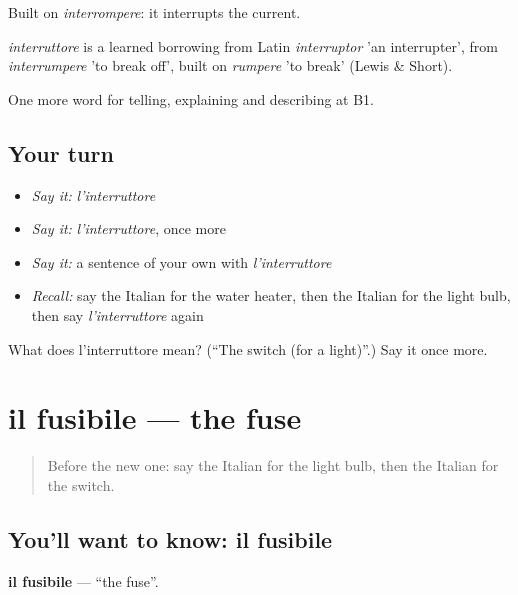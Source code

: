 Built on \emph{interrompere}: it interrupts the current.

\begin{cousinweb}
\emph{interruttore} is a learned borrowing from Latin \emph{interruptor} 'an interrupter', from \emph{interrumpere} 'to break off', built on \emph{rumpere} 'to break' (Lewis \& Short).
\end{cousinweb}

\begin{grammarlens}[title={What you've built}]
One more word for telling, explaining and describing at B1.
\end{grammarlens}

\subsection*{Your turn}
\begin{itemize}
\raggedright
  \item \emph{Say it:} \emph{l'interruttore}
  \item \emph{Say it:} \emph{l'interruttore}, once more
  \item \emph{Say it:} a sentence of your own with \emph{l'interruttore}
  \item \emph{Recall:} say the Italian for the water heater, then the Italian for the light bulb, then say \emph{l'interruttore} again
\end{itemize}

\begin{tcolorbox}[breakable,colback=teal!4,colframe=teal!35!black,title={Before you move on}]
What does l'interruttore mean? (\textquotedblleft{}The switch (for a light)\textquotedblright{}.) Say it once more.
\end{tcolorbox}
\section[il fusibile]{il fusibile — the fuse}

\label{lesson:IT-C436-fusibile}



\begin{quote}
Before the new one: say the Italian for the light bulb, then the Italian for the switch.
\end{quote}

\subsection*{You'll want to know: il fusibile}
\textbf{il fusibile} — \textquotedblleft{}the fuse\textquotedblright{}.

